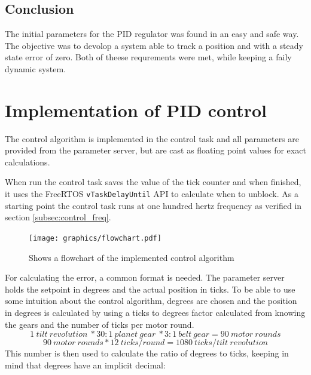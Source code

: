 \subsection{Conclusion}
The initial parameters for the PID regulator was found in an easy and safe way. The objective was to devolop a system able to track a position and with a steady state error of zero. Both of theese requrements were met, while keeping a faily dynamic system.


\section{Implementation of PID control}
The control algorithm is implemented in the control task and all parameters are provided from the parameter server, but are cast as  floating point values for exact calculations.

When run the control task saves the value of the tick counter and when finished, it uses the FreeRTOS \texttt{vTaskDelayUntil} API to calculate when to unblock. As a starting point the control task runs at one hundred hertz frequency as verified in section \ref{subsec:control_freq}.

\begin{figure}[htb]
	\begin{center}
	\texttt{[image: graphics/flowchart.pdf]}
	\caption{Shows a flowchart of the implemented control algorithm}
	\label{fig:pid_flow}			
	\end{center}
\end{figure}

For calculating the error, a common format is needed. The parameter server holds the setpoint in degrees and the actual position in ticks. To be able to use some intuition about the control algorithm, degrees are chosen and the position in degrees is calculated by using a ticks to degrees factor calculated from knowing the gears and the number of ticks per motor round.
\begin{equation}
1 \ tilt \ revolution \ * 30:1 \ planet \ gear \ * 3:1 \ belt \ gear = 90 \ motor \ rounds
\end{equation}
\begin{equation}
 90 \ motor \ rounds * 12 \ ticks/round = 1080 \ ticks/tilt \ revolution
\end{equation}
This number is then used to calculate the ratio of degrees to ticks, keeping in mind that degrees have an implicit decimal:


